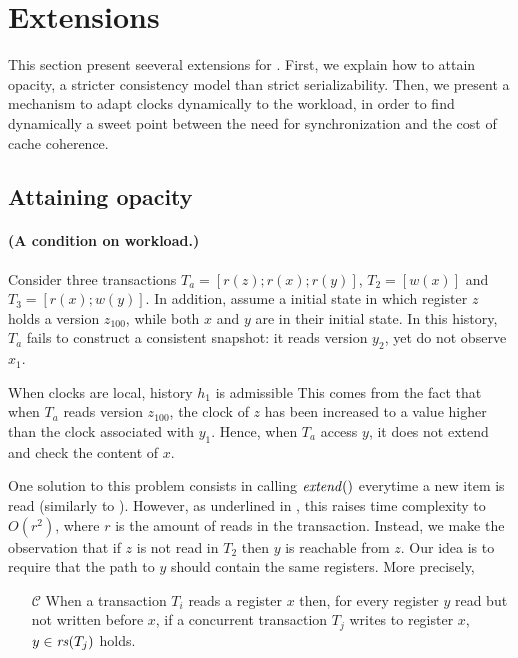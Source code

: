\section{Extensions}

This section present seeveral extensions for .
First, we explain how to attain opacity, a stricter consistency model than strict serializability.
Then, we present a mechanism to adapt clocks dynamically to the workload, in order to find dynamically a sweet point between the need for synchronization and the cost of cache coherence.

\subsection{Attaining opacity}

\paragraph{(A condition on workload.)}
Consider three transactions $T_a=[r(z);r(x);r(y)]$, $T_2=[w(x)]$ and $T_3=[r(x);w(y)]$.
In addition, assume a initial state in which register $z$ holds a version $z_{100}$, while both $x$ and $y$ are in their initial state.
In this history, $T_a$ fails to construct a consistent snapshot: it reads version $y_2$, yet do not observe $x_1$.



When clocks are local, history $h_1$ is admissible 
This comes from the fact that when $T_a$ reads version $z_{100}$, the clock of $z$ has been increased to a value higher than the clock associated with $y_1$.
Hence, when $T_a$ access $y$, it does not extend and check the content of $x$.

One solution to this problem consists in calling $\stmExtend{}$ everytime a new item is read (similarly to \cite{}).
However, as underlined in , this raises time complexity to $O(r^2)$, where $r$ is the amount of reads in the transaction.
Instead, we make the observation that if $z$ is not read in $T_2$ then $y$ is reachable from $z$.
Our idea is to require that the path to $y$ should contain the same registers.
More precisely,

\begin{itemize}
\item[$\mathcal{C}$]
  When a transaction $T_i$ reads a register $x$ then, for every register $y$ read but not written before $x$, if a concurrent transaction $T_j$ writes to register $x$, $y \in \readSetOf{T_j}$ holds.
\end{itemize}


